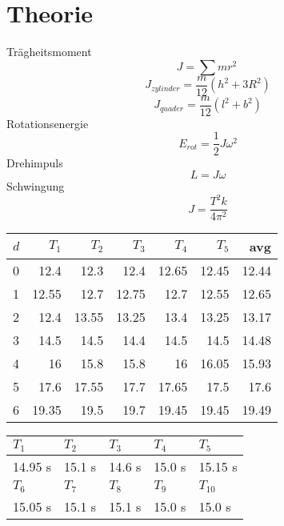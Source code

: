 \documentclass[12pt,a4paper]{article}
\begin{document}
\section{Theorie}
Tr\"agheitsmoment
\[  J = \sum mr^2\ \]
\[  J_{zylinder} = \frac{m}{12}(h^2 + 3R^2) \]
\[ J_{quader} = \frac{m}{12}(l^2 + b^2) \]
Rotationsenergie
\[ E_{rot} = \frac{1}{2}J\omega^2 \]
Drehimpuls
\[ L = J\omega \]
Schwingung
\[ J = \frac{T^2k}{4\pi^2} \]

\begin{tabular}{|l|r|r|r|r|r|r|}
\hline
$d$&$T_1$&$T_2$&$T_3$&$T_4$&$T_5$&avg \\
\hline
0&12.4&12.3&12.4&12.65&12.45&12.44\\
1&12.55&12.7&12.75&12.7&12.55&12.65\\
2&12.4&13.55&13.25&13.4&13.25&13.17\\
3&14.5&14.5&14.4&14.5&14.5&14.48\\
4&16&15.8&15.8&16&16.05&15.93\\
5&17.6&17.55&17.7&17.65&17.5&17.6\\
6&19.35&19.5&19.7&19.45&19.45&19.49\\
\hline
\end{tabular}

\begin{tabular}{|l|l|l|l|l|}
\hline
$T_{1}$&$T_{2}$&$T_{3}$&$T_{4}$&$T_{5}$\\
\hline
14.95 s&15.1 s&14.6 s&15.0 s&15.15 s\\
\hline
\hline
$T_{6}$&$T_{7}$&$T_{8}$&$T_{9}$&$T_{10}$\\
\hline
15.05 s&15.1 s&15.1 s&15.0 s&15.0 s\\
\hline
\hline
\end{tabular}
\end{document}
